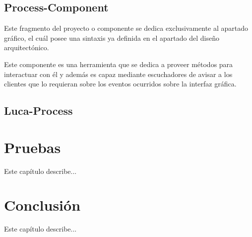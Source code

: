 \documentclass[a4paper,12pt]{book}
\begin{document}
	\minitoc
	
		\section{Process-Component}
		
		Este fragmento del proyecto o componente se dedica exclusivamente al apartado gráfico, el cuál posee una sintaxis ya definida en el apartado del diseño arquitectónico.
		
		
		\vspace{5mm}
		
		
		Este componente es una herramienta que se dedica a proveer métodos para interactuar con él y además es capaz mediante escuchadores de avisar a los clientes que lo requieran sobre los eventos ocurridos sobre la interfaz gráfica.
		
		
		\section{Luca-Process}
	
	\afterpage{\null\newpage}
	\newpage
	
	
	\chapter{Pruebas}
	
	Este capítulo describe...
	
	\minitoc
	
	\afterpage{\null\newpage}
	\newpage
	
	
	
	\chapter{Conclusión}
	
	Este capítulo describe...
	
	\minitoc


	\clearpage
	
	
	
	
	\clearpage
\end{document}
